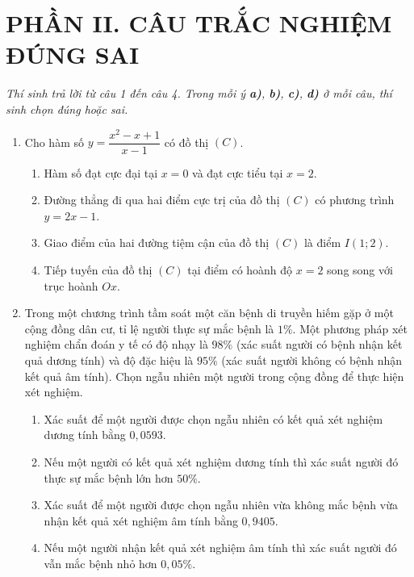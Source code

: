 \documentclass[12pt,a4paper]{article}
\begin{document}
\vspace{0.4cm}
\section*{\large PHẦN II. CÂU TRẮC NGHIỆM ĐÚNG SAI}
\textit{Thí sinh trả lời từ câu 1 đến câu 4. Trong mỗi ý \textbf{a)}, \textbf{b)}, \textbf{c)}, \textbf{d)} ở mỗi câu, thí sinh chọn đúng hoặc sai.}

\begin{enumerate}[label=\textbf{Câu \arabic*:}, leftmargin=*]

\item Cho hàm số $y = \dfrac{x^2 - x + 1}{x - 1}$ có đồ thị $(C)$.
\begin{enumerate}[label=\textbf{\alph*)}]
    \item Hàm số đạt cực đại tại $x = 0$ và đạt cực tiểu tại $x = 2$.
    \item Đường thẳng đi qua hai điểm cực trị của đồ thị $(C)$ có phương trình $y = 2x - 1$.
    \item Giao điểm của hai đường tiệm cận của đồ thị $(C)$ là điểm $I(1; 2)$.
    \item Tiếp tuyến của đồ thị $(C)$ tại điểm có hoành độ $x = 2$ song song với trục hoành $Ox$.
\end{enumerate}

\item Trong một chương trình tầm soát một căn bệnh di truyền hiếm gặp ở một cộng đồng dân cư, tỉ lệ người thực sự mắc bệnh là $1\%$. Một phương pháp xét nghiệm chẩn đoán y tế có độ nhạy là $98\%$ (xác suất người có bệnh nhận kết quả dương tính) và độ đặc hiệu là $95\%$ (xác suất người không có bệnh nhận kết quả âm tính). Chọn ngẫu nhiên một người trong cộng đồng để thực hiện xét nghiệm.
\begin{enumerate}[label=\textbf{\alph*)}]
    \item Xác suất để một người được chọn ngẫu nhiên có kết quả xét nghiệm dương tính bằng $0{,}0593$.
    \item Nếu một người có kết quả xét nghiệm dương tính thì xác suất người đó thực sự mắc bệnh lớn hơn $50\%$.
    \item Xác suất để một người được chọn ngẫu nhiên vừa không mắc bệnh vừa nhận kết quả xét nghiệm âm tính bằng $0{,}9405$.
    \item Nếu một người nhận kết quả xét nghiệm âm tính thì xác suất người đó vẫn mắc bệnh nhỏ hơn $0{,}05\%$.
\end{enumerate}


\end{enumerate}
\end{document}
